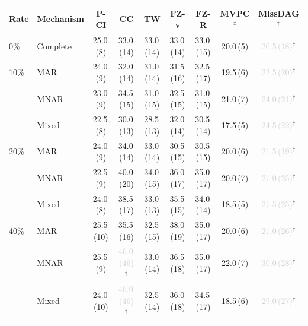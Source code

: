 \begin{tabular}{llccccccc}
    \toprule
    Rate & Mechanism & P-CI & CC & TW & FZ-v & FZ-R & MVPC$^\ddagger$ & MissDAG$^\dagger$ \\
    \midrule
    0\% & Complete & 25.0\,{\scriptsize(8)} & 33.0\,{\scriptsize(14)} & 33.0\,{\scriptsize(14)} & 33.0\,{\scriptsize(14)} & 33.0\,{\scriptsize(15)} & 20.0\,{\scriptsize(5)} & \textcolor{lightgray}{20.5\,{\scriptsize(18)}}$^\dagger$ \\
    \midrule
    10\% & MAR   & 24.0\,{\scriptsize(9)} & 32.0\,{\scriptsize(14)} & 31.0\,{\scriptsize(14)} & 31.5\,{\scriptsize(16)} & 32.5\,{\scriptsize(17)} & 19.5\,{\scriptsize(6)} & \textcolor{lightgray}{22.5\,{\scriptsize(20)}}$^\dagger$ \\
         & MNAR  & 23.0\,{\scriptsize(9)} & 34.5\,{\scriptsize(15)} & 31.0\,{\scriptsize(15)} & 32.5\,{\scriptsize(15)} & 31.0\,{\scriptsize(15)} & 21.0\,{\scriptsize(7)} & \textcolor{lightgray}{24.0\,{\scriptsize(21)}}$^\dagger$ \\
         & Mixed & 22.5\,{\scriptsize(8)} & 30.0\,{\scriptsize(13)} & 28.5\,{\scriptsize(13)} & 32.0\,{\scriptsize(14)} & 30.5\,{\scriptsize(14)} & 17.5\,{\scriptsize(5)} & \textcolor{lightgray}{24.5\,{\scriptsize(22)}}$^\dagger$ \\
    \midrule
    20\% & MAR   & 24.0\,{\scriptsize(9)} & 34.0\,{\scriptsize(14)} & 33.0\,{\scriptsize(14)} & 30.5\,{\scriptsize(15)} & 30.5\,{\scriptsize(15)} & 20.0\,{\scriptsize(6)} & \textcolor{lightgray}{21.5\,{\scriptsize(19)}}$^\dagger$ \\
         & MNAR  & 22.5\,{\scriptsize(9)} & 40.0\,{\scriptsize(20)} & 34.0\,{\scriptsize(15)} & 36.0\,{\scriptsize(17)} & 35.0\,{\scriptsize(17)} & 20.0\,{\scriptsize(7)} & \textcolor{lightgray}{27.0\,{\scriptsize(25)}}$^\dagger$ \\
         & Mixed & 24.0\,{\scriptsize(8)} & 38.5\,{\scriptsize(17)} & 33.0\,{\scriptsize(13)} & 35.5\,{\scriptsize(15)} & 34.0\,{\scriptsize(14)} & 18.5\,{\scriptsize(5)} & \textcolor{lightgray}{27.5\,{\scriptsize(25)}}$^\dagger$ \\
    \midrule
    40\% & MAR   & 25.5\,{\scriptsize(10)} & 35.5\,{\scriptsize(16)} & 32.5\,{\scriptsize(15)} & 38.0\,{\scriptsize(19)} & 35.0\,{\scriptsize(17)} & 20.0\,{\scriptsize(6)} & \textcolor{lightgray}{27.0\,{\scriptsize(26)}}$^\dagger$ \\
         & MNAR  & 25.5\,{\scriptsize(9)} & \textcolor{lightgray}{46.0\,{\scriptsize(46)}}$^\dagger$ & 33.0\,{\scriptsize(14)} & 36.5\,{\scriptsize(18)} & 35.0\,{\scriptsize(17)} & 22.0\,{\scriptsize(7)} & \textcolor{lightgray}{30.0\,{\scriptsize(28)}}$^\dagger$ \\
         & Mixed & 24.0\,{\scriptsize(10)} & \textcolor{lightgray}{46.0\,{\scriptsize(46)}}$^\dagger$ & 32.5\,{\scriptsize(14)} & 36.0\,{\scriptsize(18)} & 34.5\,{\scriptsize(17)} & 18.5\,{\scriptsize(6)} & \textcolor{lightgray}{29.0\,{\scriptsize(27)}}$^\dagger$ \\
    \bottomrule
\end{tabular}
